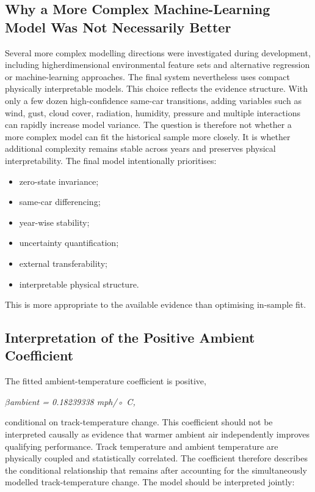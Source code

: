 \subsection{Why a More Complex Machine-Learning Model Was Not Necessarily Better}
Several more complex modelling directions were investigated during development, including higherdimensional environmental feature sets and alternative regression or machine-learning approaches. The final system nevertheless uses compact physically interpretable models. This choice reflects the evidence structure. With only a few dozen high-confidence same-car transitions, adding variables such as wind, gust, cloud cover, radiation, humidity, pressure and multiple interactions can rapidly increase model variance. The question is therefore not whether a more complex model can fit the historical sample more closely. It is whether additional complexity remains stable across years and preserves physical interpretability. The final model intentionally prioritises:

\begin{itemize}
\item zero-state invariance;
\item same-car differencing;
\item year-wise stability;
\item uncertainty quantification;
\item external transferability;
\item interpretable physical structure.
\end{itemize}

This is more appropriate to the available evidence than optimising in-sample fit.

\subsection{Interpretation of the Positive Ambient Coefficient}
The fitted ambient-temperature coefficient is positive,

\begin{center}\textit{\ensuremath{\beta}ambient = 0.18239338 mph/◦ C,}\end{center}

conditional on track-temperature change. This coefficient should not be interpreted causally as evidence that warmer ambient air independently improves qualifying performance. Track temperature and ambient temperature are physically coupled and statistically correlated. The coefficient therefore describes the conditional relationship that remains after accounting for the simultaneously modelled track-temperature change. The model should be interpreted jointly:

